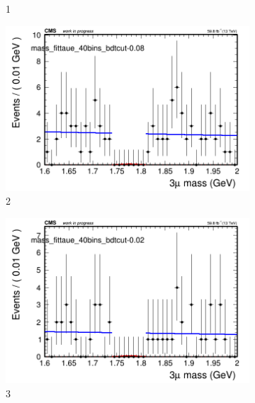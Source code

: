 \begin{figure}[h!]
\begin{subfigure}{0.2\textwidth}
        \caption{1}
    \end{subfigure}
    \begin{subfigure}{0.2\textwidth}
        \includegraphics[width=\textwidth]{unfixed_exp/plots/taue/massfit_taue_40bins_bdtcut-0.08.png}
        \caption{2}
    \end{subfigure}
    \begin{subfigure}{0.2\textwidth}
        \includegraphics[width=\textwidth]{unfixed_exp/plots/taue/massfit_taue_40bins_bdtcut-0.02.png}
        \caption{3}
    \end{subfigure}
    \begin{subfigure}{0.2\textwidth}

\end{subfigure}
\end{figure}
